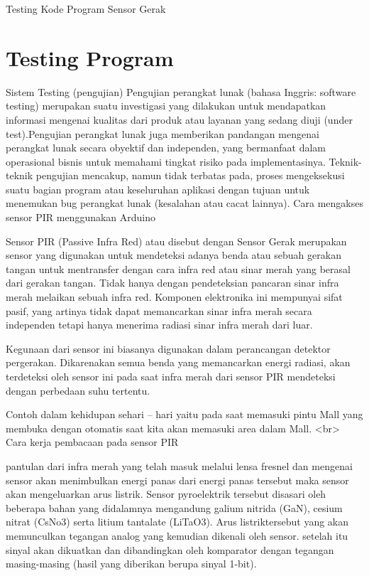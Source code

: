 
Testing Kode Program Sensor Gerak

\section {Testing Program}
Sistem Testing (pengujian)
Pengujian perangkat lunak (bahasa Inggris: software testing) merupakan suatu investigasi yang dilakukan untuk mendapatkan informasi mengenai kualitas dari produk atau layanan yang sedang diuji (under test).Pengujian perangkat lunak juga memberikan pandangan mengenai perangkat lunak secara obyektif dan independen, yang bermanfaat dalam operasional bisnis untuk memahami tingkat risiko pada implementasinya. Teknik-teknik pengujian mencakup, namun tidak terbatas pada, proses mengeksekusi suatu bagian program atau keseluruhan aplikasi dengan tujuan untuk menemukan bug perangkat lunak (kesalahan atau cacat lainnya).
Cara mengakses sensor PIR menggunakan Arduino

Sensor PIR (Passive Infra Red) atau disebut dengan Sensor Gerak merupakan sensor yang digunakan untuk mendeteksi adanya benda atau sebuah gerakan tangan untuk mentransfer dengan cara infra red atau sinar merah yang berasal dari gerakan tangan. Tidak hanya dengan pendeteksian pancaran sinar infra merah melaikan sebuah infra red.
Komponen elektronika ini mempunyai sifat pasif, yang artinya tidak dapat memancarkan sinar infra merah secara independen tetapi hanya menerima radiasi sinar infra merah dari luar.

Kegunaan dari sensor ini biasanya digunakan dalam perancangan detektor pergerakan. Dikarenakan semua benda yang memancarkan energi radiasi, akan terdeteksi oleh sensor ini pada saat infra merah dari sensor PIR mendeteksi dengan perbedaan suhu tertentu.

Contoh dalam kehidupan sehari – hari yaitu pada saat memasuki pintu Mall yang membuka dengan otomatis saat kita akan memasuki area dalam Mall.
<br>
Cara kerja pembacaan pada sensor PIR

pantulan dari infra merah yang telah masuk melalui lensa fresnel dan mengenai sensor akan menimbulkan energi panas dari energi panas tersebut maka sensor akan mengeluarkan arus listrik.
Sensor pyroelektrik tersebut disasari oleh beberapa bahan yang didalamnya mengandung galium nitrida (GaN), cesium nitrat (CsNo3) serta litium tantalate (LiTaO3).
Arus listriktersebut yang akan memunculkan tegangan analog yang kemudian dikenali oleh sensor. setelah itu sinyal akan dikuatkan dan dibandingkan oleh komparator dengan tegangan masing-masing (hasil yang diberikan berupa sinyal 1-bit).

